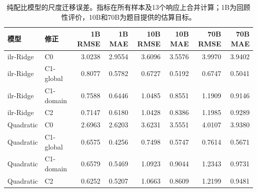 \begin{table}[htbp]
\centering
\small
\caption{纯配比模型的尺度迁移误差。指标在所有样本及13个响应上合并计算；1B为回顾性评价，10B和70B为题目提供的估算目标。}
\label{tab:q1-mixture-scale}
\begin{tabular}{llrrrrrr}
\hline
模型 & 修正 & 1B RMSE & 1B MAE & 10B RMSE & 10B MAE & 70B RMSE & 70B MAE \\
\hline
ilr-Ridge & C0 & 3.0238 & 2.9554 & 3.6096 & 3.5576 & 3.9970 & 3.9402 \\
ilr-Ridge & C1-global & 0.8077 & 0.5782 & 0.6727 & 0.5192 & 0.6747 & 0.5041 \\
ilr-Ridge & C1-domain & 0.7588 & 0.6446 & 1.0485 & 0.8551 & 1.1909 & 0.9146 \\
ilr-Ridge & C2 & 0.7147 & 0.6180 & 1.0428 & 0.8386 & 1.1985 & 0.9289 \\
Quadratic & C0 & 2.6963 & 2.6203 & 3.6231 & 3.5551 & 4.0107 & 3.9380 \\
Quadratic & C1-global & 0.6575 & 0.4256 & 0.7498 & 0.5747 & 0.7614 & 0.5671 \\
Quadratic & C1-domain & 0.6579 & 0.5469 & 1.0923 & 0.9044 & 1.2343 & 0.9731 \\
Quadratic & C2 & 0.6252 & 0.5207 & 1.0663 & 0.8609 & 1.2199 & 0.9481 \\
\hline
\end{tabular}
\end{table}
